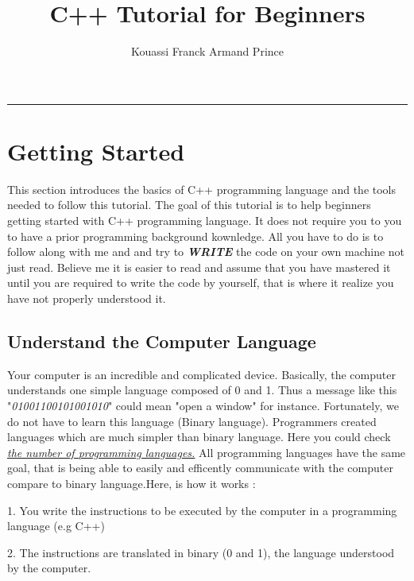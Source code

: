 \documentclass[11pt, a4paper]{article}
\title{C++ Tutorial for Beginners}
\author{Kouassi Franck Armand Prince}
\date{}
\begin{document}
\maketitle\hrule
\newpage

\tableofcontents
\listoffigures
\lstlistoflistings
\pagebreak

\section{Getting Started}
This section introduces the basics of C++ programming language and the tools
needed to follow this tutorial. The goal of this tutorial is to help beginners
getting started with C++ programming language. It does not require you to you to
have a prior programming background kownledge. All you have to do is to follow along
with me and and try to \textbf{\textit{WRITE}} the code on your own machine not just read.
Believe me it is easier to read and assume that you have mastered it until you are required
to write the code by yourself, that is where it realize you have not properly understood it.

\subsection{Understand the Computer Language}
Your computer is an incredible and complicated device. Basically, the computer
understands one simple language composed of 0 and 1. Thus a message like this
"\textit{01001100101001010}" could mean "open a window" for instance. Fortunately, we do not have
to learn this language (Binary language). Programmers created languages which are much simpler
than binary language. Here you could check \href{https://en.wikipedia.org/wiki/List_of_programming_languages}
{\emph{\textit{the number of programming languages.}}} \newline
All programming languages have the same goal, that is being able to easily and efficently
communicate with the computer compare to binary language.\newline Here, is how it works :

1. You write the instructions to be executed by the computer in a programming language (e.g C++)

2. The instructions are translated in binary (0 and 1), the language understood by the computer.
\end{document}
